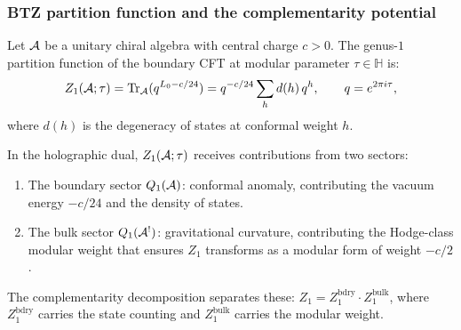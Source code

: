 \subsubsection{BTZ partition function and the complementarity
potential}
\label{subsubsec:thqg-III-btz-partition}

\begin{theorem}
\label{thm:thqg-III-btz-partition}
Let $\mathcal{A}$ be a unitary chiral algebra with central charge
$c > 0$. The genus-$1$ partition function of the boundary
CFT at modular parameter $\tau \in \mathbb{H}$ is:
\begin{equation}\label{eq:thqg-III-genus-1-partition}
Z_1(\mathcal{A}; \tau)
= \operatorname{Tr}_{\mathcal{A}}(q^{L_0 - c/24})
= q^{-c/24} \sum_h d(h)\, q^h,
\qquad q = e^{2\pi i \tau},
\end{equation}
where $d(h)$ is the degeneracy of states at conformal
weight $h$.

In the holographic dual, $Z_1(\mathcal{A}; \tau)$ receives
contributions from two sectors:
\begin{enumerate}[label=\textup{(\alph*)}]
\item The boundary sector
 $Q_1(\mathcal{A})$: conformal anomaly, contributing the
 vacuum energy $-c/24$ and the density of states.
\item The bulk sector
 $Q_1(\mathcal{A}^!)$: gravitational curvature, contributing the
 Hodge-class modular weight that ensures $Z_1$ transforms
 as a modular form of weight $-c/2$.
\end{enumerate}
The complementarity decomposition separates these:
$Z_1 = Z_1^{\mathrm{bdry}} \cdot Z_1^{\mathrm{bulk}}$,
where $Z_1^{\mathrm{bdry}}$ carries the state counting
and $Z_1^{\mathrm{bulk}}$ carries the modular weight.
\end{theorem}

